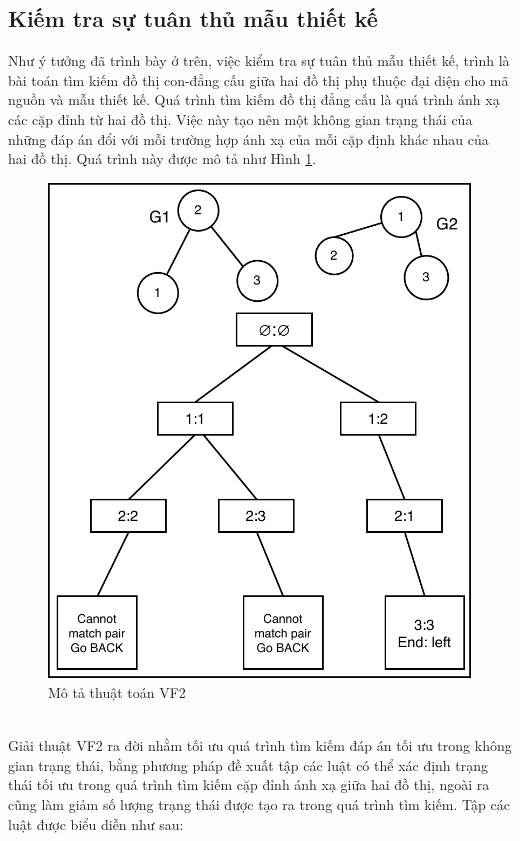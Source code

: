 \documentclass[12pt]{report}
\begin{document}
\subsection{Kiếm tra sự tuân thủ mẫu thiết kế}
Như ý tưởng đã trình bày ở trên, việc kiểm tra sự tuân thủ mẫu thiết kế, trình là bài toán tìm kiếm đồ thị con-đẳng cấu giữa hai đồ thị phụ thuộc đại diện cho mã nguồn và mẫu thiết kế. Quá trình tìm kiếm đồ thị đẳng cấu là quá trình ánh xạ các cặp đỉnh từ hai đồ thị. Việc này tạo nên một không gian trạng thái của những đáp án đổi với mỗi trường hợp ánh xạ của mỗi cặp định khác nhau của hai đồ thị. Quá trình này được mô tả như Hình \ref{fig:vf2_example}.
\begin{figure}[!htbp]
	\centering
	\includegraphics[scale=0.5]{images/_vf2_example}
	\caption{Mô tả thuật toán VF2}
	\label{fig:vf2_example}
\end{figure}\\
\noindent Giải thuật VF2 ra đời nhằm tối ưu quá trình tìm kiếm đáp án tối ưu trong không gian trạng thái, bằng phương pháp đề xuất tập các luật có thể xác định trạng thái tối ưu trong quá trình tìm kiếm cặp đỉnh ánh xạ giữa hai đồ thị, ngoài ra cũng làm giảm số lượng trạng thái được tạo ra trong quá trình tìm kiếm. Tập các luật được biểu diễn như sau:
\end{document}
